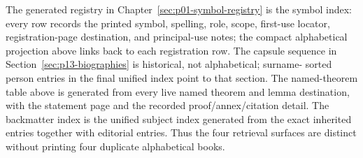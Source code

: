 The generated registry in Chapter~\ref{sec:p01-symbol-registry} is the symbol
index: every row records the printed symbol, spelling, role, scope, first-use
locator, registration-page destination, and principal-use notes; the compact
alphabetical projection above links back to each registration row. The capsule sequence in
Section~\ref{sec:p13-biographies} is historical, not alphabetical; surname-
sorted person entries in the final unified index point to that section. The
named-theorem table above is generated from every live named theorem and lemma
destination, with the statement page and the recorded proof/annex/citation
detail.
The backmatter index is the unified subject index generated from the exact
inherited entries together with editorial entries. Thus the four retrieval
surfaces are distinct without printing four duplicate alphabetical books.
